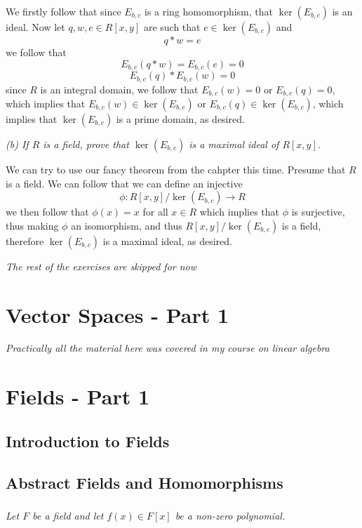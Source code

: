 \documentclass[11pt,oneside,titlepage]{book}
\begin{document}
We firstly follow that since $E_{b, c}$ is a ring homomorphism, that
$\ker(E_{b, c})$ is an ideal. Now let $q, w, e \in R[x, y]$ are such
that $e \in \ker(E_{b, c})$ and
$$q * w = e$$
we follow that
$$E_{b, c}(q * w) = E_{b, c}(e) = 0$$
$$E_{b, c}(q) * E_{b, c}(w) = 0$$
since $R$ is an integral domain, we follow that $E_{b, c}(w) = 0$ or
$E_{b, c}(q) = 0$, which implies that $E_{b, c}(w) \in \ker(E_{b, c})$
or $E_{b, c}(q) \in \ker(E_{b, c})$, which implies that $\ker(E_{b,
c})$ is a prime domain, as desired.

\textit{(b) If $R$ is a field, prove that $\ker(E_{b,c})$ is a maximal
ideal of $R[x, y]$.}

We can try to use our fancy theorem from the cahpter this time.
Presume that $R$ is a field. We can follow that we can define an
injective
$$\phi: R[x, y]/\ker(E_{b,c}) \to R$$
we then follow that $\phi(x) = x$ for all $x \in R$ which implies that
$\phi$ is surjective, thus making $\phi$ an isomorphism, and thus
$R[x, y]/\ker(E_{b,c})$ is a field, therefore $\ker(E_{b,c})$ is a
maximal ideal, as desired.


\textit{The rest of the exercises are skipped for now}

\chapter{Vector Spaces - Part 1}

\textit{Practically all the material here was covered in my course on
linear algebra }

\chapter{Fields - Part 1}

\section{Introduction to Fields}

\section{Abstract Fields and Homomorphisms}

\subsection{}

\textit{Let $F$ be a field and let $f(x) \in F[x]$ be a non-zero
polynomial.}
\end{document}
